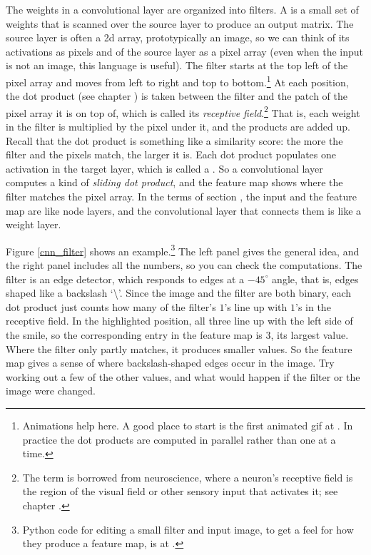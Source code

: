 The weights in a convolutional layer are organized into filters. A  is a small set of weights that is scanned over the source layer to produce an output matrix. The source layer is often a 2d array, prototypically an image, so we can think of its activations as pixels and of the source layer as a pixel array (even when the input is not an image, this language is useful). The filter starts at the top left of the pixel array and moves from left to right and top to bottom.\footnote{Animations help here. A good place to start is the first animated gif at . In practice the dot products are computed in parallel rather than one at a time.} At each position, the dot product (see chapter ) is taken between the filter and the patch of the pixel array it is on top of, which is called its \emph{receptive field}.\footnote{The term is borrowed from neuroscience, where a neuron's receptive field is the region of the visual field or other sensory input that activates it; see chapter .} That is, each weight in the filter is multiplied by the pixel under it, and the products are added up. Recall that the dot product is something like a similarity score: the more the filter and the pixels match, the larger it is. Each dot product populates one activation in the target layer, which is called a . So a convolutional layer computes a kind of \emph{sliding dot product}, and the feature map shows where the filter matches the pixel array. In the terms of section , the input and the feature map are like node layers, and the convolutional layer that connects them is like a weight layer.

Figure \ref{cnn_filter} shows an example.\footnote{Python code for editing a small filter and input image, to get a feel for how they produce a feature map, is at .} The left panel gives the general idea, and the right panel includes all the numbers, so you can check the computations. The filter is an edge detector, which responds to edges at a $-45^\circ$ angle, that is, edges shaped like a backslash `\textbackslash'. Since the image and the filter are both binary, each dot product just counts how many of the filter's $1$'s line up with $1$'s in the receptive field. In the highlighted position, all three line up with the left side of the smile, so the corresponding entry in the feature map is $3$, its largest value. Where the filter only partly matches, it produces smaller values. So the feature map gives a sense of where backslash-shaped edges occur in the image. Try working out a few of the other values, and what would happen if the filter or the image were changed.

